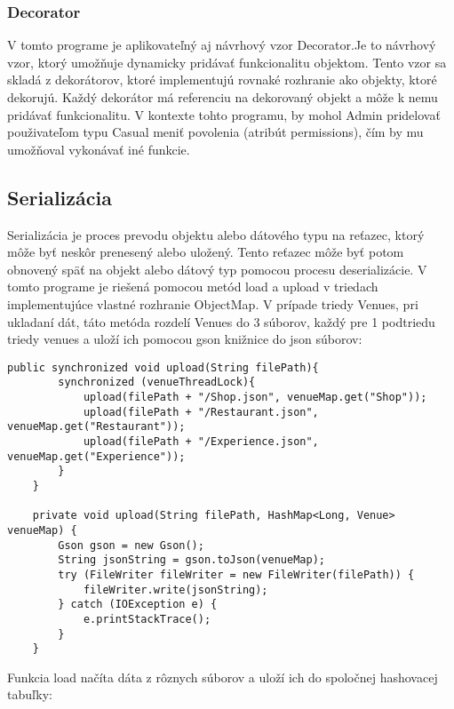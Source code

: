 \documentclass{article}
\begin{document}
\subsubsection{Decorator}
V tomto programe je aplikovateľný aj návrhový vzor Decorator.Je to návrhový vzor, ktorý umožňuje dynamicky pridávať funkcionalitu objektom. Tento vzor sa skladá z dekorátorov, ktoré implementujú rovnaké rozhranie ako objekty, ktoré dekorujú. Každý dekorátor má referenciu na dekorovaný objekt a môže k nemu pridávať funkcionalitu. V kontexte tohto programu, by mohol Admin pridelovať použivateľom typu Casual meniť povolenia (atribút permissions), čím by mu umožňoval vykonávať iné funkcie.
\subsection{Serializácia}
Serializácia je proces prevodu objektu alebo dátového typu na reťazec, ktorý môže byť neskôr prenesený alebo uložený. Tento reťazec môže byť potom obnovený späť na objekt alebo dátový typ pomocou procesu deserializácie. V tomto programe je riešená pomocou metód load a upload v triedach implementujúce vlastné rozhranie ObjectMap.
V prípade triedy Venues, pri ukladaní dát, táto metóda rozdelí Venues do 3 súborov, každý pre 1 podtriedu triedy venues a uloží ich pomocou gson knižnice do json súborov:
\begin{verbatim}
public synchronized void upload(String filePath){
        synchronized (venueThreadLock){
            upload(filePath + "/Shop.json", venueMap.get("Shop"));
            upload(filePath + "/Restaurant.json", venueMap.get("Restaurant"));
            upload(filePath + "/Experience.json", venueMap.get("Experience"));
        }
    }

    private void upload(String filePath, HashMap<Long, Venue> venueMap) {
        Gson gson = new Gson();
        String jsonString = gson.toJson(venueMap);
        try (FileWriter fileWriter = new FileWriter(filePath)) {
            fileWriter.write(jsonString);
        } catch (IOException e) {
            e.printStackTrace();
        }
    }
\end{verbatim}
Funkcia load načíta dáta z rôznych súborov a uloží ich do spoločnej hashovacej tabuľky:
\end{document}
